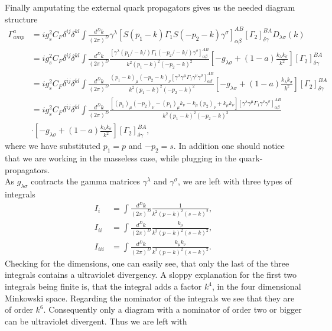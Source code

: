 	Finally amputating the external quark propagators gives us the needed diagram structure
	\begin{equation}
		\begin{split}
			\Gamma^a_{amp} &= ig_s^2 C_F \delta^{ij}\delta^{kl}\int\frac{d^Dk}{(2\pi)^D}\gamma^\lambda \left [S(p_1-k)\Gamma_1S(-p_2-k)\gamma^\sigma \right]^{AB}_{\alpha\beta} \left [\Gamma_2\right]^{BA}_{\delta\gamma}D_{\lambda\sigma}(k) \\
			&=  ig_s^2C_F\delta^{ij}\delta^{kl}\int\frac{d^Dk}{(2\pi)^D}\frac{[\gamma^\lambda(p_1\!\!\!/-k\!\!\!/)\Gamma_1(-p_2\!\!\!\!\!/-k\!\!\!/)\gamma^\sigma]^{AB}_{\alpha\beta}}{k^2(p_1-k)^2(-p_2-k)^2}\left[-g_{\lambda\sigma}+(1-a)\frac{k_\lambda k_\sigma}{k^2}\right] \left[ \Gamma_2 \right ]^{BA}_{\delta\gamma} \\
			&=  ig_s^2C_F\delta^{ij}\delta^{kl}\int\frac{d^Dk}{(2\pi)^D}\frac{(p_1-k)_\mu (-p_2 -k)_\nu [\gamma^\lambda \gamma^\mu \Gamma_1\gamma^\nu\gamma^\sigma]^{AB}_{\alpha\beta}}{k^2(p_1-k)^2(-p_2-k)^2}\left[-g_{\lambda\sigma}+(1-a)\frac{k_\lambda k_\sigma}{k^2}\right] \left[ \Gamma_2 \right ]^{BA}_{\delta\gamma} \\
			&=  ig_s^2C_F\delta^{ij}\delta^{kl}\int\frac{d^Dk}{(2\pi)^D}\frac{[(p_1)_\mu(-p_2)_\nu -(p_1)_\mu k_\nu - k_\mu (p_2)_\nu + k_\mu k_\nu] [\gamma^\lambda \gamma^\mu \Gamma_1\gamma^\nu\gamma^\sigma]^{AB}_{\alpha\beta}}{k^2(p_1-k)^2(-p_2-k)^2} \\
			&\cdot \left[-g_{\lambda\sigma}+(1-a)\frac{k_\lambda k_\sigma}{k^2}\right] \left[ \Gamma_2 \right ]^{BA}_{\delta\gamma},
		\end{split}
	\end{equation}
	where we have substituted $p_1 = p$ and $-p_2 = s$. In addition one should notice that we are working in the masseless case, while plugging in the quark-propagators. \\
	As $g_{\lambda\sigma}$ contracts the gamma matrices $\gamma^\lambda$ and $\gamma^\sigma$, we are left with three types of integrals
	\begin{align}
		I_i &= \int\frac{d^Dk}{(2\pi)^D}\frac{1}{k^2(p-k)^2(s-k)^2}, \\
		I_{ii} &= \int\frac{d^Dk}{(2\pi)^D}\frac{k_\mu}{k^2(p-k)^2(s-k)^2}, \\
		I_{iii} &= \int\frac{d^Dk}{(2\pi)^D}\frac{k_\mu k_\nu}{k^2(p-k)^2(s-k)^2}.
	\end{align}
	 Checking for the dimensions, one can easily see, that only the last of the three integrals contains a ultraviolet divergency. A sloppy explanation for the first two integrals being finite is, that the integral adds a factor $k^4$, in the four dimensional Minkowski space. Regarding the nominator of the integrals we see that they are of order $k^6$. Consequently only a diagram with a nominator of order two or bigger can be ultraviolet divergent. Thus we are left with
